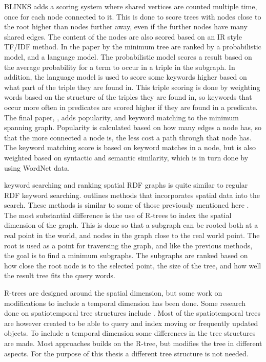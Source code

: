 BLINKS adds a scoring system where shared vertices are counted multiple time, once for each node connected to it. This is done to score trees with nodes close to the root higher than nodes further away, even if the further nodes have many shared edges. The content of the nodes are also scored based on an IR style TF/IDF method. In the paper by \cite{Elbassuoni:2011:KSO:2063576.2063615} the minimum tree are ranked by a probabilistic model, and a language model. The probabilistic model scores a result based on the average probability for a term to occur in a triple in the subgraph. In addition, the language model is used to score some keywords higher based on what part of the triple they are found in. This triple scoring is done by weighting words based on the structure of the triples they are found in, so keywords that occur more often in predicates are scored higher if they are found in a predicate. The final paper, \cite{4812421}, adds popularity, and keyword matching to the minimum spanning graph. Popularity is calculated based on how many edges a node has, so that the more connected a node is, the less cost a path through that node has. The keyword matching score is based on keyword matches in a node, but is also weighted based on syntactic and semantic similarity, which is in turn done by using WordNet data.


keyword searching and ranking spatial RDF graphs is quite similar to regular RDF keyword searching. \cite{Shi:2016:TRS:2882903.2882941} outlines methods that incorporates spatial data into the search. These methods is similar to some of those previously mentioned here \citep{4812421, Elbassuoni:2011:KSO:2063576.2063615}. The most substantial difference is the use of R-trees to index the spatial dimension of the graph. This is done so that a subgraph can be rooted both at a real point in the world, and nodes in the graph close to the real world point. The root is used as a point for traversing the graph, and like the previous methods, the goal is to find a minimum subgraphs. The subgraphs are ranked based on how close the root node is to the selected point, the size of the tree, and how well the result tree fits the query words.

R-trees are designed around the spatial dimension, but some work on modifications to include a temporal dimension has been done. Some research done on spatiotemporal tree structures include \citep{Tao:2003:TOS:1315451.1315519, r-tree-spatio-temporal}. Most of the spatiotemporal trees are however created to be able to query and index moving or frequently updated objects. To include a temporal dimension some differences in the tree structures are made. Most approaches builds on the R-tree, but modifies the tree in different aspects. For the purpose of this thesis a different tree structure is not needed.


\glsresetall